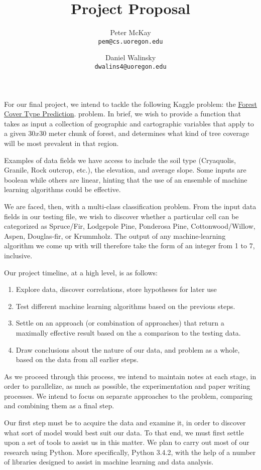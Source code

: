 \documentclass[10pt,a4paper]{article}
\author{
  Peter McKay\\
  \texttt{pem@cs.uoregon.edu}
  \and
  Daniel Walinsky\\
  \texttt{dwalins4@uoregon.edu}
}
\title{Project Proposal}
\begin{document}
\maketitle

For our final project, we intend to tackle the following Kaggle problem:
the 
\href{http://www.kaggle.com/c/forest-cover-type-prediction}{Forest Cover Type Prediction}.
problem. In brief, we wish to provide a function that takes as input 
a collection of geographic and cartographic variables that apply to a 
given $30 x 30$ meter chunk of forest, and determines what kind of tree 
coverage will be most prevalent in that region.

Examples of data fields we have access to include the soil type 
(Cryaquolis, Granile, Rock outcrop, etc.), the elevation, and average slope.
Some inputs are boolean while others are linear, hinting that the use
of an ensemble of machine learning algorithms could be effective.

We are faced, then, with a multi-class classification problem. From the input 
data fields in our testing file, we wish to discover whether a 
particular cell can be categorized as
Spruce/Fir,
Lodgepole Pine,
Ponderosa Pine,
Cottonwood/Willow,
Aspen,
Douglas-fir, or
Krummholz.
The output of any machine-learning algorithm we come up with will 
therefore take the form of an integer from 1 to 7, inclusive.

Our project timeline, at a high level, is as follows:
\begin{enumerate}
\item Explore data, discover correlations, store hypotheses for later 
  use
\item Test different machine learning algorithms based on the previous 
  steps.
\item Settle on an approach (or combination of approaches) that return 
  a maximally effective result based on the a comparison to the testing 
  data.
\item Draw conclusions about the nature of our data, and problem as a 
  whole, based on the data from all earlier steps.
\end{enumerate}

As we proceed through this process, we intend to maintain notes at each 
stage, in order to parallelize, as much as possible, the experimentation 
and paper writing processes. We intend to focus on separate approaches 
to the problem, comparing and combining them as a final step.

Our first step must be to acquire the data and examine it, in order to 
discover what sort of model would best suit our data.  To that end, we 
must first settle upon a set of tools to assist us in this matter.  
We plan to carry out most of our research using Python.  More 
specifically, Python 3.4.2, with the help of a number of libraries 
designed to assist in machine learning and data analysis.  
\end{document}
